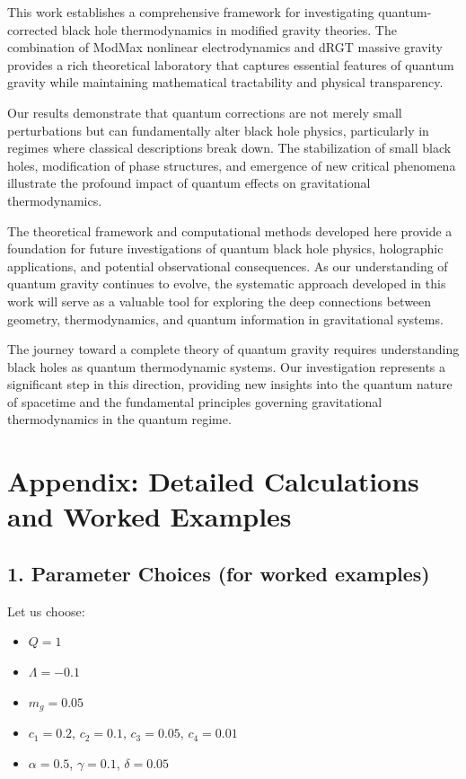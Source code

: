 \documentclass[superscriptaddress, prd, aps,amsmath,amssymb,showpacs,showkeys, onecolumn]{revtex4-2}
\begin{document}
This work establishes a comprehensive framework for investigating quantum-corrected black hole thermodynamics in modified gravity theories. The combination of ModMax nonlinear electrodynamics and dRGT massive gravity provides a rich theoretical laboratory that captures essential features of quantum gravity while maintaining mathematical tractability and physical transparency.

Our results demonstrate that quantum corrections are not merely small perturbations but can fundamentally alter black hole physics, particularly in regimes where classical descriptions break down. The stabilization of small black holes, modification of phase structures, and emergence of new critical phenomena illustrate the profound impact of quantum effects on gravitational thermodynamics.

The theoretical framework and computational methods developed here provide a foundation for future investigations of quantum black hole physics, holographic applications, and potential observational consequences. As our understanding of quantum gravity continues to evolve, the systematic approach developed in this work will serve as a valuable tool for exploring the deep connections between geometry, thermodynamics, and quantum information in gravitational systems.

The journey toward a complete theory of quantum gravity requires understanding black holes as quantum thermodynamic systems. Our investigation represents a significant step in this direction, providing new insights into the quantum nature of spacetime and the fundamental principles governing gravitational thermodynamics in the quantum regime.

\appendix
\section*{Appendix: Detailed Calculations and Worked Examples}
\subsection*{1. Parameter Choices (for worked examples)}
Let us choose:
\begin{itemize}
    \item $Q = 1$
    \item $\Lambda = -0.1$
    \item $m_g = 0.05$
    \item $c_1 = 0.2$, $c_2 = 0.1$, $c_3 = 0.05$, $c_4 = 0.01$
    \item $\alpha = 0.5$, $\gamma = 0.1$, $\delta = 0.05$
\end{itemize}
\end{document}
